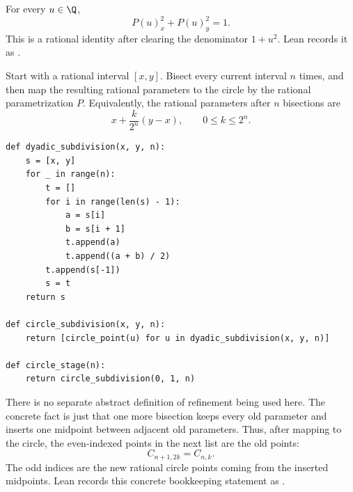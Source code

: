 \begin{remark}
\label{rem:rational-circle-equation}
For every \(u\in\Q\),
\[
  P(u)_x^2+P(u)_y^2=1.
\]
This is a rational identity after clearing the denominator \(1+u^2\).  Lean
records it as .
\end{remark}

\begin{remark}
\label{rem:dyadic-rational-circle-stages}
Start with a rational interval \([x,y]\).  Bisect every current interval
\(n\) times, and then map the resulting rational parameters to the circle by
the rational parametrization \(P\).  Equivalently, the rational parameters
after \(n\) bisections are
\[
  x+\frac{k}{2^n}(y-x),
  \qquad 0\le k\le 2^n.
\]
\begin{verbatim}
def dyadic_subdivision(x, y, n):
    s = [x, y]
    for _ in range(n):
        t = []
        for i in range(len(s) - 1):
            a = s[i]
            b = s[i + 1]
            t.append(a)
            t.append((a + b) / 2)
        t.append(s[-1])
        s = t
    return s

def circle_subdivision(x, y, n):
    return [circle_point(u) for u in dyadic_subdivision(x, y, n)]

def circle_stage(n):
    return circle_subdivision(0, 1, n)
\end{verbatim}
\end{remark}

\begin{remark}
\label{rem:dyadic-rational-circle-refinement}
There is no separate abstract definition of refinement being used here.  The
concrete fact is just that one more bisection keeps every old parameter and
inserts one midpoint between adjacent old parameters.  Thus, after mapping to
the circle, the even-indexed points in the next list are the old points:
\[
  C_{n+1,2k}=C_{n,k}.
\]
The odd indices are the new rational circle points coming from the inserted
midpoints.  Lean records this concrete bookkeeping statement as
.
\end{remark}

